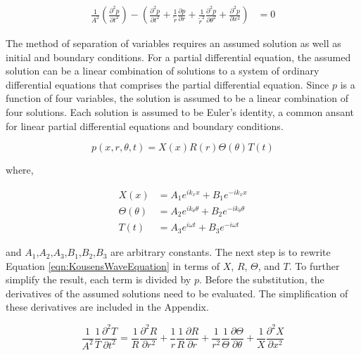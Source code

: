 \begin{align*} 
    \frac{1}{A^2}\left(
        \frac{\partial^2 {p}}{\partial t^2}
    \right) - 
        \left(
            \frac{\partial^2 {p}}{\partial t^2} + 
            \frac{1}{\tilde{r}}\frac{\partial p}{\partial r} +
            \frac{1}{\tilde{r}^2} \frac{\partial^2 p}{\partial \theta^2} + 
            \frac{\partial^2 p}{\partial x^2} 
        \right) &= 0  
\end{align*} 

The method of separation of variables requires an assumed solution as well as initial and boundary 
conditions. For a partial differential equation, the assumed solution can be a 
linear combination of solutions to a system of ordinary differential equations that
comprises the partial differential equation. Since $p$ is a function of four
variables, the solution is assumed to be a linear combination of four solutions.
Each solution is assumed to be Euler's identity, a common ansant for linear partial 
differential equations and boundary conditions.

\begin{equation}
    p(x,r,\theta,t) = X(x) R(r) \Theta(\theta) T(t)
\end{equation}

where, 

\begin{align*}
    X(x) &=
    A_1 e^{ik_x x} +
    B_1 e^{-ik_x x }\\
    \Theta(\theta) &=
    A_2 e^{i k_{\theta} \theta } +
    B_2 e^{-ik_{\theta} \theta }\\
    T(t) &=
    A_3 e^{i \omega t } +
    B_3 e^{-i\omega t  }
\end{align*}

and $A_1$,$A_2$,$A_3$,$B_1$,$B_2$,$B_3$ are arbitrary constants.  The next step 
is to rewrite Equation \ref{eqn:KousensWaveEquation} in terms of $X$, $R$, $\Theta$,
and $T$. To further simplify the result, each term is divided by $p$.
Before the substitution, the derivatives of the assumed solutions need to be
evaluated. The simplification of these derivatives are included in the Appendix.


\begin{equation}
    \frac{1}{A^2} \frac{1}{T}\frac{\partial^2 T}{\partial t^2} = 
    \frac{1}{R}\frac{\partial^2 R}{\partial r^2 } +
    \frac{1}{r}\frac{1}{R}\frac{\partial R}{\partial r}  + 
    \frac{1}{r^2}\frac{1}{\Theta}\frac{\partial \Theta}{\partial \theta} + 
    \frac{1}{X}\frac{\partial^2 X}{\partial x^2}
    \label{eqn:waveode}
\end{equation}

